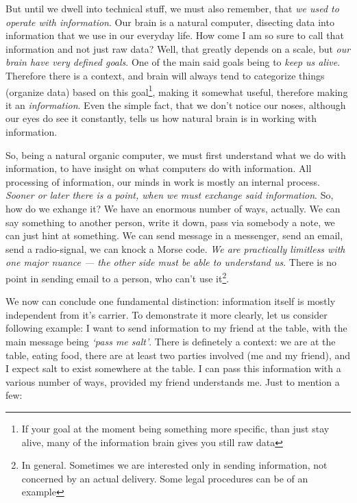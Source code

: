 \documentclass[../../what-is-computer.tex]{subfiles}
\begin{document}
    But until we dwell into technical stuff, we must also remember, that \emph{we used to operate with information}. Our brain is a natural computer, disecting data
    into information that we use in our everyday life. How come I am so sure to call that information and not just raw data? Well, that greatly depends on a 
    scale, but
    \emph{our brain have very defined goals}. One of the main said goals being to \emph{keep us alive}. Therefore there is a context, and brain will always tend to 
    categorize things (organize data) based on this goal\footnote{If your goal at the moment being something more specific, than just stay alive, many of the information brain gives you still raw data},
    making it somewhat useful, therefore making it an \emph{information}. Even the simple fact, that we don't notice our noses, although our eyes do see it constantly, 
    tells us how natural brain is in working with information. \par

    So, being a natural organic computer, we must first understand what we do with information, to have insight on what computers do with information. All processing 
    of information, our minds in work is mostly an internal process. \emph{Sooner or later there is a point, when we must exchange said information}. So, how do we
    exhange it? We have an enormous number of ways, actually. We can say something to another person, write it down, pass via somebody a note, we can just hint at something.
    We can send message in a messenger, send an email, send a radio-signal, we can knock a Morse code. \emph{We are practically limitless with one major nuance --- the other
    side must be able to understand us}. There is no point in sending email to a person, who can't use it\footnote{In general. Sometimes we are interested only
    in sending information, not concerned by an actual delivery. Some legal procedures can be of an example}. \par

    We now can conclude one fundamental distinction: information itself is mostly independent from it's carrier. To demonstrate it more clearly, let us consider
    following example: I want to send information to my friend at the table, with the main message being \emph{`pass me salt'}. There is definetely a context:
    we are at the table, eating food, there are at least two parties involved (me and my friend), and I expect salt to exist somewhere at the table. I can pass this 
    information with a various number of ways, provided my friend understands me. Just to mention a few:
\end{document}
